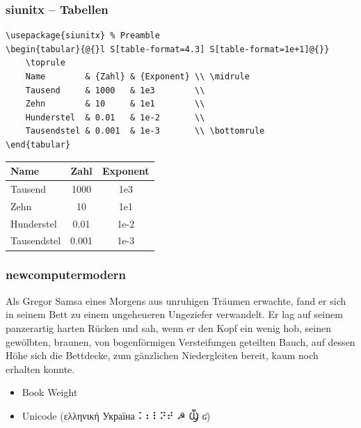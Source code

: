 \documentclass{beamer}
\begin{document}
\begin{frame}[fragile]
    \frametitle{siunitx -- Tabellen}
    \begin{lstlisting}[basicstyle=\ttfamily\footnotesize]
\usepackage{siunitx} % Preamble
\begin{tabular}{@{}l S[table-format=4.3] S[table-format=1e+1]@{}}
    \toprule
    Name        & {Zahl} & {Exponent} \\ \midrule
    Tausend     & 1000   & 1e3        \\
    Zehn        & 10     & 1e1        \\
    Hunderstel  & 0.01   & 1e-2       \\
    Tausendstel & 0.001  & 1e-3       \\ \bottomrule
\end{tabular}
    \end{lstlisting}
    \vspace*{-1ex}
    \begin{center}
        \begin{tabular}{@{}l S[table-format=4.3] S[table-format=1e+1]@{}}
            \toprule
            Name        & {Zahl} & {Exponent} \\ \midrule
            Tausend     & 1000   & 1e3        \\
            Zehn        & 10     & 1e1        \\
            Hunderstel  & 0.01   & 1e-2       \\
            Tausendstel & 0.001  & 1e-3       \\ \bottomrule
        \end{tabular}
    \end{center}
\end{frame}

\begin{frame}[fragile]
    \frametitle{newcomputermodern}
    \begin{multicols}{2}
        \small{}

        Als Gregor Samsa eines Morgens aus unruhigen Träumen erwachte, fand er sich in seinem Bett zu einem ungeheueren Ungeziefer verwandelt.
        Er lag auf seinem panzerartig harten Rücken und sah, wenn er den Kopf ein wenig hob, seinen gewölbten, braunen, von bogenförmigen Versteifungen geteilten Bauch, auf dessen Höhe sich die Bettdecke, zum gänzlichen Niedergleiten bereit, kaum noch erhalten konnte.
    \end{multicols}
    \begin{itemize}
        \item Book Weight
        \item Unicode (ελληνική Україна ⠅⠆⠇⠝⠞  ☭ Ⳃ ʛ)
    \end{itemize}
\end{frame}
\end{document}
